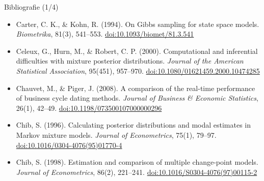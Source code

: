 \begin{frame}{Bibliografie (1/4)}
\begin{itemize}
    \item Carter, C. K., \& Kohn, R. (1994). On Gibbs sampling for state space models. \textit{Biometrika}, 81(3), 541--553. \href{https://doi.org/10.1093/biomet/81.3.541}{doi:10.1093/biomet/81.3.541}
    \item Celeux, G., Hurn, M., \& Robert, C. P. (2000). Computational and inferential difficulties with mixture posterior distributions. \textit{Journal of the American Statistical Association}, 95(451), 957--970. \href{https://doi.org/10.1080/01621459.2000.10474285}{doi:10.1080/01621459.2000.10474285}
    \item Chauvet, M., \& Piger, J. (2008). A comparison of the real-time performance of business cycle dating methods. \textit{Journal of Business \& Economic Statistics}, 26(1), 42--49. \href{https://doi.org/10.1198/073500107000000296}{doi:10.1198/073500107000000296}
    \item Chib, S. (1996). Calculating posterior distributions and modal estimates in Markov mixture models. \textit{Journal of Econometrics}, 75(1), 79--97. \href{https://doi.org/10.1016/0304-4076(95)01770-4}{doi:10.1016/0304-4076(95)01770-4}
    \item Chib, S. (1998). Estimation and comparison of multiple change-point models. \textit{Journal of Econometrics}, 86(2), 221--241. \href{https://doi.org/10.1016/S0304-4076(97)00115-2}{doi:10.1016/S0304-4076(97)00115-2}
\end{itemize}
\end{frame}

